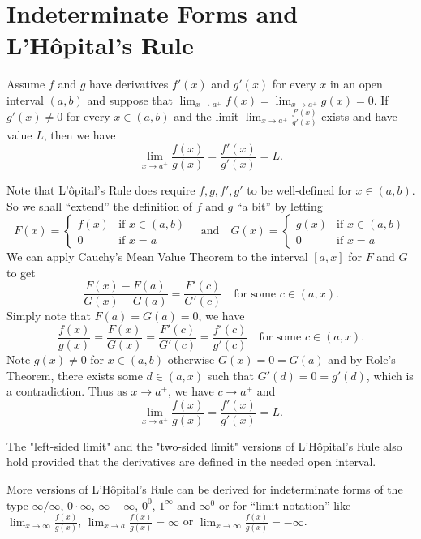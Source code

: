         \section{Indeterminate Forms and L'Hôpital's Rule}
        \begin{theoremenv}
            Assume $f$ and $g$ have derivatives $f'(x)$ and $g'(x)$ for every $x$ in an open interval $(a,b)$ and suppose that $\displaystyle \lim_{x\to a^+} f(x) = \lim_{x\to a^+} g(x) = 0$. If $g'(x) \neq 0$ for every $x\in (a,b)$ and the limit $\displaystyle \lim_{x\to a^+} \frac{f'(x)}{g'(x)}$ exists and have value $L$, then we have $$\lim_{x\to a^+} \frac{f(x)}{g(x)} = \frac{f'(x)}{g'(x)} = L.$$
        \end{theoremenv}
        \begin{proofenv}
            Note that L'ôpital's Rule does require $f,g,f',g'$ to be well-defined for $x\in (a,b)$. So we shall ``extend'' the definition of $f$ and $g$ ``a bit'' by letting
            \[
            F(x) = \begin{cases}
            f(x) & \text{if } x\in (a,b)\\
            0 & \text{if } x=a
            \end{cases}
            \quad \text{and} \quad
            G(x) = \begin{cases}
            g(x) & \text{if } x\in (a,b)\\
            0 & \text{if } x=a
            \end{cases}
            \]
            We can apply Cauchy's Mean Value Theorem to the interval $[a,x]$ for $F$ and $G$ to get
            \[
            \frac{F(x) - F(a)}{G(x) - G(a)} = \frac{F'(c)}{G'(c)} \quad \text{for some } c\in (a,x).
            \]
            Simply note that $F(a) = G(a) = 0$, we have
            \[
            \frac{f(x)}{g(x)} = \frac{F(x)}{G(x)} = \frac{F'(c)}{G'(c)} = \frac{f'(c)}{g'(c)} \quad \text{for some } c\in (a,x).
            \]
            Note $g(x) \neq 0$ for $x\in (a,b)$ otherwise $G(x) = 0 = G(a)$ and by Role's Theorem, there exists some $d\in (a,x)$ such that $G'(d) = 0 = g'(d)$, which is a contradiction. Thus as $x\to a^+$, we have $c\to a^+$ and $$\lim_{x\to a^+} \frac{f(x)}{g(x)} = \frac{f'(x)}{g'(x)} = L.$$
        \end{proofenv}
        \begin{remarkenv}
            The "left-sided limit" and the "two-sided limit" versions of L'Hôpital's Rule also hold provided that the derivatives are defined in the needed open interval.
            
            More versions of L'Hôpital's Rule can be derived for indeterminate forms of the type $\infty/\infty$, $0\cdot \infty$, $\infty - \infty$, $0^0$, $1^\infty$ and $\infty^0$ or for ``limit notation'' like $\displaystyle \lim_{x\to \infty } \frac{f(x)}{g(x)}$, $\displaystyle \lim_{x\to a} \frac{f(x)}{g(x)} = \infty$ or $\displaystyle \lim_{x\to \infty} \frac{f(x)}{g(x)} = -\infty$.
        \end{remarkenv}

